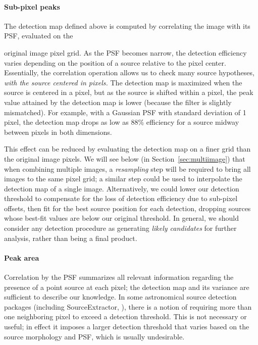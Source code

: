 \documentclass[11pt,letterpaper,linenumbers]{aastex7}
\newcommand{\doctype}{paper}
\newcommand{\secref}[1]{\mbox{Section~\ref{#1}}}
\newcommand{\changed}[1]{#1}
\begin{document}


\paragraph{Sub-pixel peaks}  The detection map defined above
is computed by correlating the image with its PSF, evaluated on the
\changed{
original image pixel
grid.  As the PSF becomes narrow, the detection efficiency varies
depending on the position of a source relative to the pixel center.  Essentially, the
correlation operation allows us to check many source hypotheses, \emph{with
the source centered in pixels.
}
The detection
map is maximized when the source is centered in a pixel, but as the source is
shifted within a pixel, the peak value attained by the detection map is
lower (because the filter is slightly mismatched).}  For example, with
a Gaussian PSF with standard deviation of 1 pixel, the detection map
drops as low as 88\% efficiency for a source midway between pixels in
both dimensions.

\changed{
This effect can be reduced by evaluating the detection map on a finer
grid than the original image pixels.  We will see below
(in \secref{sec:multiimage}) that when combining multiple images, a
\emph{resampling} step will be required to bring all images to the
same pixel grid; a similar step could be used to interpolate the
detection map of a single image.  Alternatively, we could lower our
detection threshold to compensate for the loss of detection efficiency
due to sub-pixel offsets, then fit for the best source position for
each detection, dropping sources whose best-fit values are below our
original threshold.  In general, we should consider any detection
procedure as generating \emph{likely candidates} for further analysis,
rather than being a final product.
}

\paragraph{Peak area}  Correlation by the PSF summarizes
all relevant information regarding the presence of a point source at each
pixel; the detection map and its variance are sufficient to describe
our knowledge.  In some astronomical source detection packages
(including SourceExtractor, \citealt{sourceextractor}), there is a notion of requiring more than
one neighboring pixel to exceed a detection threshold.  This is not
necessary or useful; in effect it imposes a larger detection threshold
that varies based on the source morphology and PSF, which is
usually undesirable.
\end{document}
